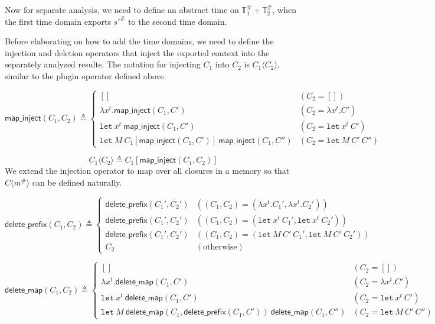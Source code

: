 \documentclass{article}
\theoremstyle{definition}
\newcommand*{\A}[1]{{#1}^{\#}}
\newcommand*{\Time}{\mathbb{T}}
\newcommand*{\ATime}{\A{\Time}}
\newcommand*{\mem}{m}
\newcommand*{\mapinject}{\mathsf{map\_inject}}
\newcommand*{\inject}[2]{{#1}\langle{#2}\rangle}
\newcommand*{\deletepre}{\mathsf{delete\_prefix}}
\newcommand*{\deletemap}{\mathsf{delete\_map}}
\newcommand*{\Let}{\mathtt{let}}
\begin{document}
Now for separate analysis, we need to define an abstract time on $\ATime_1+\ATime_2$, when the first time domain exports $\A{s'}$ to the second time domain.

Before elaborating on how to add the time domains, we need to define the injection and deletion operators that inject the exported context into the separately analyzed results.
The notation for injecting $C_{1}$ into $C_{2}$ is $\inject{C_{1}}{C_{2}}$, similar to the plugin operator defined above.

\[
  \mapinject(C_{1},C_{2})\triangleq
  \begin{cases}
    []                                                          & (C_{2}=[])                \\
    \lambda x^{t}. \mapinject(C_{1},C')                         & (C_{2}=\lambda x^{t}. C') \\
    \Let\:x^{t}\:\mapinject(C_{1},C')                           & (C_{2}=\Let\:x^{t}\:C')   \\
    \Let\:M\:C_{1}[\mapinject(C_{1},C')]\:\mapinject(C_{1},C'') & (C_{2}=\Let\:M\:C'\:C'')
  \end{cases}
\]

\[
  \inject{C_{1}}{C_{2}}\triangleq C_{1}[\mapinject(C_{1},C_{2})]
\]
We extend the injection operator to map over all closures in a memory so that $\inject{C}{\A\mem}$ can be defined naturally.

\[
  \deletepre(C_{1},C_{2})\triangleq
  \begin{cases}
    \deletepre(C_{1}',C_{2}') & ((C_{1},C_{2})=(\lambda x^{t}.C_{1}',\lambda x^{t}.C_{2}')) \\
    \deletepre(C_{1}',C_{2}') & ((C_{1},C_{2})=(\Let\: x^{t}\:C_{1}',\Let\:x^{t}\:C_{2}'))  \\
    \deletepre(C_{1}',C_{2}') & ((C_{1},C_{2})=(\Let\:M\:C'\:C_{1}',\Let\:M\:C'\:C_{2}'))   \\
    C_{2}                     & (\text{otherwise})
  \end{cases}
\]

\[
  \deletemap(C_{1},C_{2})\triangleq
  \begin{cases}
    []                                                                     & (C_{2}=[])               \\
    \lambda x^{t}.\deletemap(C_{1},C')                                     & (C_{2}=\lambda x^{t}.C') \\
    \Let\:x^{t}\:\deletemap(C_{1},C')                                      & (C_{2}=\Let\:x^{t}\:C')  \\
    \Let\:M\:\deletemap(C_{1},\deletepre(C_{1},C'))\:\deletemap(C_{1},C'') & (C_{2}=\Let\:M\:C'\:C'')
  \end{cases}
\]
\end{document}
